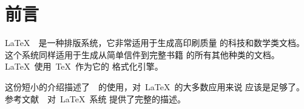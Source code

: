 

\chapter{前言}

\LaTeX{}~\cite{manual}~是一种排版系统，它非常适用于生成高印刷质量
的科技和数学类文档。这个系统同样适用于生成从简单信件到完整书籍
的所有其他种类的文档。\LaTeX~使用~\TeX{}\cite{texbook}~作为它的
格式化引擎。%

这份短小的介绍描述了~\LaTeXe{}~的使用，对~\LaTeX{}~的大多数应用来说
应该是足够了。参考文献~\cite{manual,companion}~对~\LaTeX{}~系统
提供了完整的描述。%

